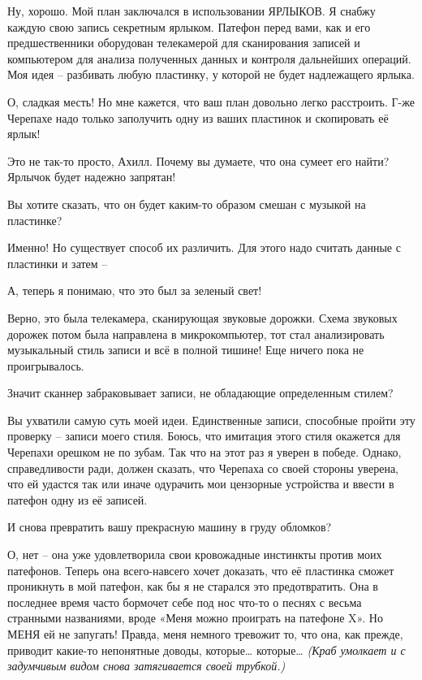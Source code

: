 \documentclass[../main.tex]{subfiles}
\begin{document}
\begin{dialogue}
 Ну, хорошо. Мой план заключался в использовании ЯРЛЫКОВ. Я снабжу каждую свою запись секретным ярлыком. Патефон перед вами, как и его предшественники оборудован телекамерой для сканирования записей и компьютером для анализа полученных данных и контроля дальнейших операций. Моя идея \--- разбивать любую пластинку, у которой не будет надлежащего ярлыка.

 О, сладкая месть! Но мне кажется, что ваш план довольно легко расстроить. Г-же Черепахе надо только заполучить одну из ваших пластинок и скопировать её ярлык!

 Это не так-то просто, Ахилл. Почему вы думаете, что она сумеет его найти? Ярлычок будет надежно запрятан!

 Вы хотите сказать, что он будет каким-то образом смешан с музыкой на пластинке?

 Именно! Но существует способ их различить. Для этого надо считать данные с пластинки и затем \---

 А, теперь я понимаю, что это был за зеленый свет!

 Верно, это была телекамера, сканирующая звуковые дорожки. Схема звуковых дорожек потом была направлена в микрокомпьютер, тот стал анализировать музыкальный стиль записи и всё в полной тишине! Еще ничего пока не проигрывалось.

 Значит сканнер забраковывает записи, не обладающие определенным стилем?

 Вы ухватили самую суть моей идеи. Единственные записи, способные пройти эту проверку \--- записи моего стиля. Боюсь, что имитация этого стиля окажется для Черепахи орешком не по зубам. Так что на этот раз я уверен в победе. Однако, справедливости ради, должен сказать, что Черепаха со своей стороны уверена, что ей удастся так или иначе одурачить мои цензорные устройства и ввести в патефон одну из её записей.

 И снова превратить вашу прекрасную машину в груду обломков?

 О, нет \--- она уже удовлетворила свои кровожадные инстинкты против моих патефонов. Теперь она всего-навсего хочет доказать, что её пластинка сможет проникнуть в мой патефон, как бы я не старался это предотвратить. Она в последнее время часто бормочет себе под нос что-то о песнях с весьма странными названиями, вроде «Меня можно проиграть на патефоне X». Но МЕНЯ ей не запугать! Правда, меня немного тревожит то, что она, как прежде, приводит какие-то непонятные доводы, которые\ldots{} которые\ldots{} \emph{(Краб умолкает и с задумчивым видом снова затягивается своей трубкой.)}


\end{dialogue}
\end{document}
